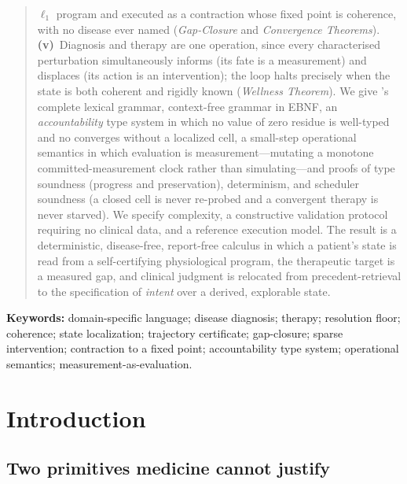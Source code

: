 \begin{quote}
$\ell_{1}$ program and executed as a contraction whose fixed point is
coherence, with no disease ever named (\emph{Gap-Closure} and
\emph{Convergence Theorems}). \textbf{(v)}~Diagnosis and therapy are one
operation, since every characterised perturbation simultaneously informs
(its fate is a measurement) and displaces (its action is an intervention);
the loop halts precisely when the state is both coherent and rigidly known
(\emph{Wellness Theorem}). We give 's complete lexical grammar,
context-free grammar in EBNF, an \emph{accountability} type system in which no
value of zero residue is well-typed and no  converges without a
localized cell, a small-step operational semantics in which evaluation is
measurement---mutating a monotone committed-measurement clock rather than
simulating---and proofs of type soundness (progress and preservation),
determinism, and scheduler soundness (a closed cell is never re-probed and a
convergent therapy is never starved). We specify complexity, a constructive
validation protocol requiring no clinical data, and a reference execution
model. The result is a deterministic, disease-free, report-free calculus in
which a patient's state is read from a self-certifying physiological program,
the therapeutic target is a measured gap, and clinical judgment is relocated
from precedent-retrieval to the specification of \emph{intent} over a derived,
explorable state.
\end{quote}



\noindent\textbf{Keywords:} domain-specific language; disease diagnosis;
therapy; resolution floor; coherence; state localization; trajectory
certificate; gap-closure; sparse intervention; contraction to a fixed point;
accountability type system; operational semantics; measurement-as-evaluation.



\section{Introduction}
\label{cfc:sec:intro}

\subsection{Two primitives medicine cannot justify}

